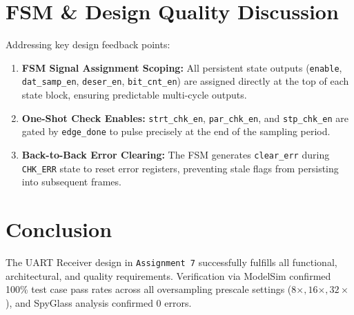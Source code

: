 \documentclass[12pt,a4paper]{article}
\begin{document}
\section{FSM \& Design Quality Discussion}

Addressing key design feedback points:

\begin{enumerate}
    \item \textbf{FSM Signal Assignment Scoping:} All persistent state outputs (\texttt{enable}, \texttt{dat\_samp\_en}, \texttt{deser\_en}, \texttt{bit\_cnt\_en}) are assigned directly at the top of each state block, ensuring predictable multi-cycle outputs.
    \item \textbf{One-Shot Check Enables:} \texttt{strt\_chk\_en}, \texttt{par\_chk\_en}, and \texttt{stp\_chk\_en} are gated by \texttt{edge\_done} to pulse precisely at the end of the sampling period.
    \item \textbf{Back-to-Back Error Clearing:} The FSM generates \texttt{clear\_err} during \texttt{CHK\_ERR} state to reset error registers, preventing stale flags from persisting into subsequent frames.
\end{enumerate}

\section{Conclusion}

The UART Receiver design in \texttt{Assignment 7} successfully fulfills all functional, architectural, and quality requirements. Verification via ModelSim confirmed 100\% test case pass rates across all oversampling prescale settings ($8\times, 16\times, 32\times$), and SpyGlass analysis confirmed 0 errors.
\end{document}
